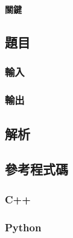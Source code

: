 \documentclass[a4paper,10pt]{article}
\begin{document}
%

\section{}

\paragraph{關鍵}

\subsection{題目}



\subsubsection{輸入}



\subsubsection{輸出}



\subsection{解析}



\subsection{參考程式碼}

\subsubsection{C++}

%

\subsubsection{Python}

%
\end{document}
